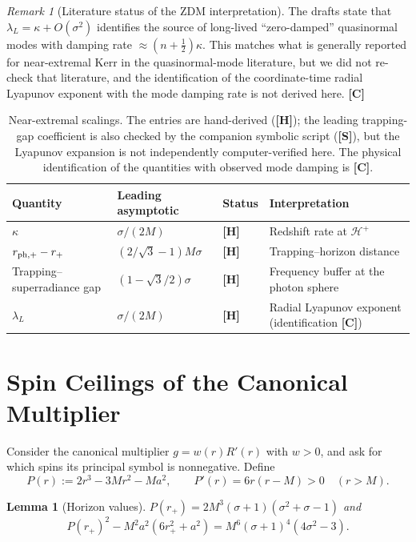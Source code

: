 \documentclass[11pt,a4paper]{article}
\newcommand{\VS}{\textcolor{vs}{\textbf{[S]}}}
\newcommand{\VH}{\textcolor{vh}{\textbf{[H]}}}
\newcommand{\CC}{\textcolor{cc}{\textbf{[C]}}}
\newtheorem{lemma}[theorem]{Lemma}
\theoremstyle{remark}
\newtheorem{remark}[theorem]{Remark}
\theoremstyle{definition}
\begin{document}
\begin{remark}[Literature status of the ZDM interpretation]
The drafts state that $\lambda_L = \kappa + O(\sigma^2)$ identifies the source of long-lived ``zero-damped'' quasinormal modes with damping rate $\approx(n+\tfrac12)\kappa$. This matches what is generally reported for near-extremal Kerr in the quasinormal-mode literature, but we did not re-check that literature, and the identification of the coordinate-time radial Lyapunov exponent with the mode damping rate is not derived here. \CC
\end{remark}

\begin{table}[H]
\centering
\caption{Near-extremal scalings. The entries are hand-derived (\VH); the leading trapping-gap coefficient is also checked by the companion symbolic script (\VS), but the Lyapunov expansion is not independently computer-verified here. The physical identification of the quantities with observed mode damping is \CC.}
\label{tab:triple}
\footnotesize\begin{tabular}{@{}llll@{}}
\toprule
Quantity & Leading asymptotic & Status & Interpretation \\
\midrule
$\kappa$ & $\sigma/(2M)$ & \VH & Redshift rate at $\mathcal{H}^+$ \\
$r_{{\rm ph},+} - r_+$ & $(2/\sqrt3-1)M\sigma$ & \VH & Trapping--horizon distance \\
Trapping--superradiance gap & $(1-\sqrt3/2)\sigma$ & \VH & Frequency buffer at the photon sphere \\
$\lambda_L$ & $\sigma/(2M)$ & \VH & Radial Lyapunov exponent (identification \CC) \\
\bottomrule
\end{tabular}
\end{table}

\section{Spin Ceilings of the Canonical Multiplier}
\label{sec:ceilings}

Consider the canonical multiplier $g = w(r)R'(r)$ with $w>0$, and ask for which spins its principal symbol is nonnegative. Define
\[
P(r) := 2r^3 - 3Mr^2 - Ma^2, \qquad P'(r) = 6r(r-M) > 0 \quad (r>M).
\]

\begin{lemma}[Horizon values]
\label{lem:Prp}
$P(r_+) = 2M^3(\sigma+1)(\sigma^2+\sigma-1)$ and
\[
P(r_+)^2 - M^2a^2(6r_+^2 + a^2) = M^6(\sigma+1)^4(4\sigma^2 - 3).
\]
\end{lemma}
\end{document}
